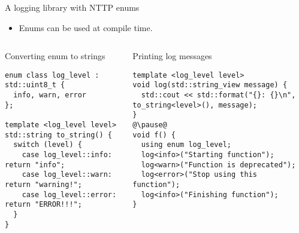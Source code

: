 \begin{frame}[t,fragile]{A logging library with NTTP enums}
\begin{itemize}
  \item Enums can be used at compile time.
\end{itemize}

\begin{columns}[T]

\begin{block}{Converting enum to strings}
\begin{lstlisting}
enum class log_level : std::uint8_t {
  info, warn, error
};

template <log_level level>
std::string to_string() {
  switch (level) {
    case log_level::info: return "info";
    case log_level::warn: return "warning!";
    case log_level::error: return "ERROR!!!";
  }
}
\end{lstlisting}
\end{block}

\pause
{}
\begin{block}{Printing log messages}
\begin{lstlisting}[escapechar=@]
template <log_level level>
void log(std::string_view message) {
  std::cout << std::format("{}: {}\n", to_string<level>(), message);
}
@\pause@
void f() {
  using enum log_level;
  log<info>("Starting function");
  log<warn>("Function is deprecated");
  log<error>("Stop using this function");
  log<info>("Finishing function");
}
\end{lstlisting}
\end{block}

\end{columns}

\end{frame}


